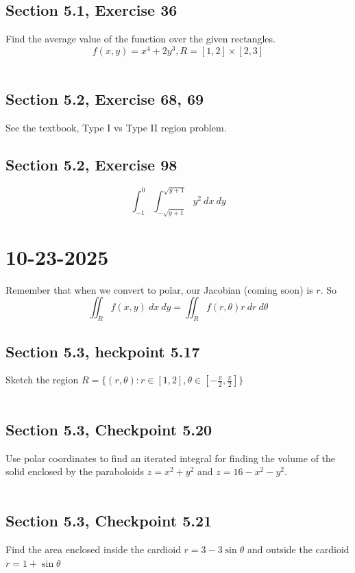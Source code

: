\documentclass[]{mangos-musings}
\begin{document}
\subsection{Section 5.1, Exercise 36}
Find the average value of the function over the given rectangles.
\[f(x, y) = x^4 + 2y^3, R = [1,2]\times [2, 3]\]
\begin{align*}
  \\ \\
\end{align*}
%
%
%
%
\subsection{Section 5.2, Exercise 68, 69}
See the textbook, Type I vs Type II region problem.

\subsection{Section 5.2, Exercise 98}
\[\int_{-1}^{0}\int_{-\sqrt{y + 1}}^{\sqrt{y + 1}}y^2 \ dx \ dy \]


\newpage
\section{10-23-2025}
Remember that when we convert to polar, our Jacobian (coming soon) is $r$. So 
\[\iint_{R}f(x, y)\ dx \ dy = \iint_R f(r,\theta) r \ dr \ d\theta\]

\subsection{Section 5.3, heckpoint 5.17}
Sketch the region $R=\{(r,\theta) : r\in[1,2], \theta\in\left[-\frac{\pi}{2},\frac{\pi}{2}\right]\}$
\begin{align*}
  \\ \\
\end{align*}
%
%
%
%
\subsection{Section 5.3, Checkpoint 5.20}
Use polar coordinates to find an iterated integral for finding the volume of the solid enclosed by the paraboloids $z = x^2 + y^2$ and $z = 16 - x^2 - y^2$.
\begin{align*}
  \\ \\
\end{align*}
%
%
%
%
\subsection{Section 5.3, Checkpoint 5.21}
Find the area enclosed inside the cardioid $r = 3 - 3\sin \theta$ and outside the cardioid $r = 1 + \sin \theta$
\begin{align*}
  \\ \\
\end{align*}
%
%
%
%
\end{document}
